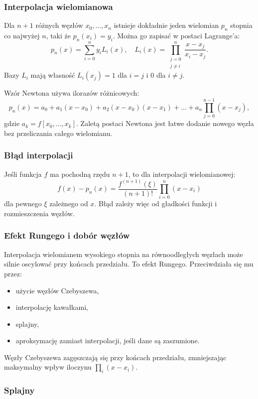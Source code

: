 \subsubsection{Interpolacja wielomianowa}

Dla $n+1$ różnych węzłów $x_0,\dots,x_n$ istnieje dokładnie jeden wielomian $p_n$ stopnia co najwyżej $n$, taki że $p_n(x_i)=y_i$. Można go zapisać w postaci Lagrange'a:
\[
p_n(x)=\sum_{i=0}^{n}y_i L_i(x),
\quad
L_i(x)=\prod_{\substack{j=0\\j\ne i}}^{n}\frac{x-x_j}{x_i-x_j}.
\]
Bazy $L_i$ mają własność $L_i(x_j)=1$ dla $i=j$ i $0$ dla $i\ne j$.

Wzór Newtona używa ilorazów różnicowych:
\[
p_n(x)=a_0+a_1(x-x_0)+a_2(x-x_0)(x-x_1)+\dots+a_n\prod_{j=0}^{n-1}(x-x_j),
\]
gdzie $a_k=f[x_0,\dots,x_k]$. Zaletą postaci Newtona jest łatwe dodanie nowego węzła bez przeliczania całego wielomianu.

\subsubsection{Błąd interpolacji}

Jeśli funkcja $f$ ma pochodną rzędu $n+1$, to dla interpolacji wielomianowej:
\[
f(x)-p_n(x)=\frac{f^{(n+1)}(\xi)}{(n+1)!}\prod_{i=0}^{n}(x-x_i)
\]
dla pewnego $\xi$ zależnego od $x$. Błąd zależy więc od gładkości funkcji i rozmieszczenia węzłów.

\subsubsection{Efekt Rungego i dobór węzłów}

Interpolacja wielomianem wysokiego stopnia na równoodległych węzłach może silnie oscylować przy końcach przedziału. To efekt Rungego. Przeciwdziała się mu przez:
\begin{itemize}
  \item użycie węzłów Czebyszewa,
  \item interpolację kawałkami,
  \item splajny,
  \item aproksymację zamiast interpolacji, jeśli dane są zaszumione.
\end{itemize}

Węzły Czebyszewa zagęszczają się przy końcach przedziału, zmniejszając maksymalny wpływ iloczynu $\prod_i(x-x_i)$.

\subsubsection{Splajny}

